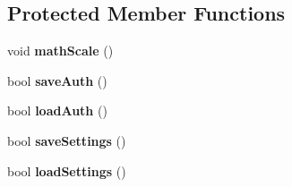 \subsection*{Protected Member Functions}
\begin{DoxyCompactItemize}
\item 
\hypertarget{class_scales_class_a055690429a6b1fcba8f1070de11677f2}{void {\bfseries math\-Scale} ()}\label{class_scales_class_a055690429a6b1fcba8f1070de11677f2}

\item 
\hypertarget{class_scales_class_a0f2963f601e7da50261dfcaf5f89ed36}{bool {\bfseries save\-Auth} ()}\label{class_scales_class_a0f2963f601e7da50261dfcaf5f89ed36}

\item 
\hypertarget{class_scales_class_a51f3e1a10319ded4a7cd6f307ba7281b}{bool {\bfseries load\-Auth} ()}\label{class_scales_class_a51f3e1a10319ded4a7cd6f307ba7281b}

\item 
\hypertarget{class_scales_class_a8e865cd6b25f06005276fcd5bc6e6bc9}{bool {\bfseries save\-Settings} ()}\label{class_scales_class_a8e865cd6b25f06005276fcd5bc6e6bc9}

\item 
\hypertarget{class_scales_class_ae07b634f4c9c0dd238539fddf089c87a}{bool {\bfseries load\-Settings} ()}\label{class_scales_class_ae07b634f4c9c0dd238539fddf089c87a}

\end{DoxyCompactItemize}
